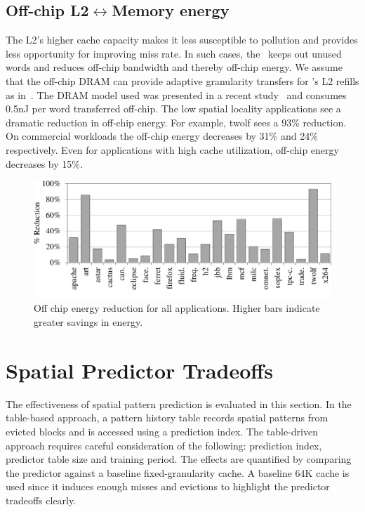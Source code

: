 {{\subsection{Off-chip L2$\leftrightarrow$Memory energy}
The L2's higher cache capacity makes it less susceptible to pollution and provides less opportunity for improving miss rate. In such cases, the \AC\ keeps out unused words and reduces off-chip bandwidth and thereby off-chip energy. We assume that the off-chip DRAM can provide adaptive granularity transfers for \AC{}'s L2 refills as in~\cite{Yoon_Jeong_Erez_2011}. The DRAM model used was presented in a recent study~\cite{exascale} and consumes 0.5nJ per word transferred off-chip. The low spatial locality applications see a dramatic reduction in off-chip energy. For example, twolf sees a 93\% reduction. On commercial workloads the off-chip energy decreases by 31\% and 24\% respectively. Even for applications with high cache utilization, off-chip energy decreases by 15\%.

\begin{figure}[h]
  \centering
  \includegraphics[width=\textwidth]{files/Plots/08-Oracle-OffChip-Energy.pdf}
  \caption[Off-Chip Energy Reduction]{Off chip energy reduction for all applications. Higher bars indicate greater savings in energy.}
  \label{fig:offchip_energy}
\end{figure}


\section{Spatial Predictor Tradeoffs}
\label{sec:spatial_predictor_tradeoffs}

The effectiveness of spatial pattern prediction is evaluated in this section. In the table-based approach, a pattern history table records spatial patterns from evicted blocks and is accessed using a prediction index. The table-driven approach requires careful consideration of the following: prediction index, predictor table size and training period. The effects are quantified by comparing the predictor against a baseline fixed-granularity cache. A baseline 64K cache is used since it induces enough misses and evictions to highlight the predictor tradeoffs clearly.

}}
